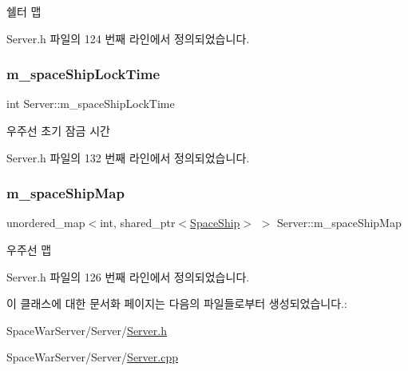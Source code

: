 쉘터 맵 



Server.\+h 파일의 124 번째 라인에서 정의되었습니다.

\mbox{\label{class_server_a21ee3e9152293a6e6d47fd569ee3f37a}} 
\subsubsection{\texorpdfstring{m\+\_\+space\+Ship\+Lock\+Time}{m\_spaceShipLockTime}}
{\footnotesize\ttfamily int Server\+::m\+\_\+space\+Ship\+Lock\+Time\hspace{0.3cm}{\ttfamily [private]}}



우주선 초기 잠금 시간 



Server.\+h 파일의 132 번째 라인에서 정의되었습니다.

\mbox{\label{class_server_aa20a2aa16045180559ef43a7087e7e95}} 
\subsubsection{\texorpdfstring{m\+\_\+space\+Ship\+Map}{m\_spaceShipMap}}
{\footnotesize\ttfamily unordered\+\_\+map$<$int, shared\+\_\+ptr$<$\hyperlink{class_space_ship}{Space\+Ship}$>$ $>$ Server\+::m\+\_\+space\+Ship\+Map\hspace{0.3cm}{\ttfamily [private]}}



우주선 맵 



Server.\+h 파일의 126 번째 라인에서 정의되었습니다.



이 클래스에 대한 문서화 페이지는 다음의 파일들로부터 생성되었습니다.\+:\begin{DoxyCompactItemize}
\item 
Space\+War\+Server/\+Server/\hyperlink{_server_8h}{Server.\+h}\item 
Space\+War\+Server/\+Server/\hyperlink{_server_8cpp}{Server.\+cpp}\end{DoxyCompactItemize}
